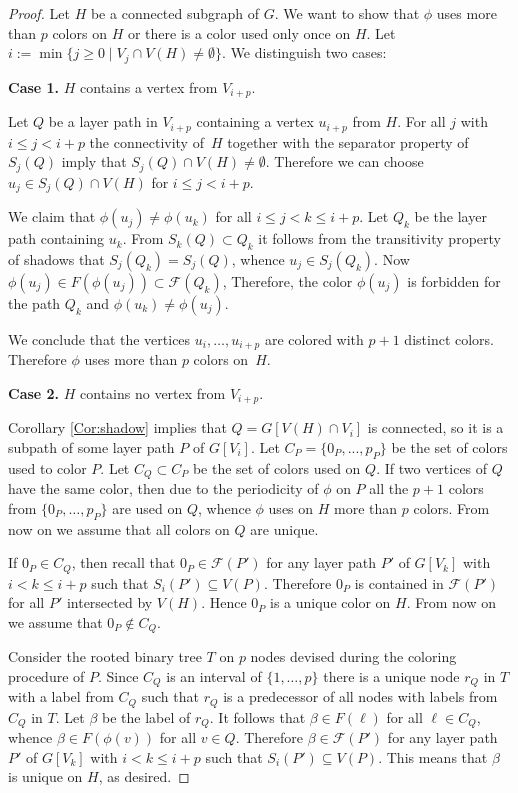 \begin{proof}
  Let $H$ be a connected subgraph of $G$. We want to show that $\phi$
  uses more than $p$ colors on $H$ or there is a color used only once
  on $H$. Let $i:=\min\{j\geq0\mid V_j\cap V(H)\neq \emptyset\}$.  We distinguish two
  cases: \medskip

\noindent\textbf{Case 1.}
$H$ contains a vertex from $V_{i+p}$.

Let $Q$ be a layer path in $V_{i+p}$ containing a vertex $u_{i+p}$
from $H$. For all $j$ with $i\leq j < i+p$ the connectivity of~$H$
together with the separator property of $S_j(Q)$ imply that
$S_j(Q) \cap V(H) \neq \emptyset$. Therefore we can choose
$u_j \in S_j(Q) \cap V(H)$ for $i\leq j < i+p$.

We claim that $\phi(u_j) \neq \phi(u_k)$ for all
$i\leq j < k \leq i+p$.  Let $Q_k$ be the layer path containing
$u_k$. From $S_k(Q) \subset Q_k$ it follows from the transitivity
property of shadows that $S_j(Q_k) = S_j(Q)$, whence $u_j \in S_j(Q_k)$. Now
$\phi(u_j) \in F(\phi(u_j)) \subset \mathcal{F}(Q_k)$,
Therefore, the color $\phi(u_j)$ is forbidden for the path $Q_k$ 
and $\phi(u_k)\neq\phi(u_j)$.
  
We conclude that the vertices $u_i,\ldots,u_{i+p}$ are colored with $p+1$ 
distinct colors. Therefore $\phi$ uses more than $p$ colors on~$H$.
\medskip
  
  \noindent\textbf{Case 2.}
  $H$ contains no vertex from $V_{i+p}$.
		
  Corollary \ref{Cor:shadow} implies that $Q=G[V(H)\cap V_i]$ is connected, so
  it is a subpath of some layer path $P$ of $G[V_i]$. Let $C_P=\{0_P,...,p_P\}$ be the set of colors
  used to color $P$.
  Let $C_Q\subset C_P$ be the set of colors used on $Q$.
  If two vertices of $Q$ have the same color, then due to the periodicity
  of $\phi$ on $P$ all the $p+1$ colors from $\{0_P,\ldots,p_P\}$ are used on $Q$, whence
  $\phi$ uses on $H$
  more than $p$ colors. From now on we assume that all colors on $Q$
  are unique.
  
  If $0_P \in C_Q$, then recall that $0_P \in \mathcal{F}(P')$ for any layer path
  $P'$ of $G[V_k]$ with $i<k\leq i+p$ such that $S_i(P') \subseteq V(P)$.
  Therefore $0_P$ is contained in $\mathcal{F}(P')$ for all $P'$ intersected
  by $V(H)$. Hence $0_P$ is a unique color on $H$. From now on we
  assume that $0_P \not\in C_Q$.
		
  Consider the rooted binary tree $T$ on $p$ nodes devised during the coloring procedure 
  of $P$. Since $C_Q$ is an interval of $\{1,\ldots,p\}$ 
  there is a unique node $r_Q$ in $T$ with a label from $C_Q$ such
  that $r_Q$ is a predecessor of all nodes with labels from $C_Q$ in $T$.
  Let $\beta$ be the label
  of $r_Q$. It follows that $\beta \in F(\ell)$ for all $\ell\in C_Q$, whence
  $\beta\in F(\phi(v))$ for all $v\in Q$.  Therefore $\beta \in \mathcal{F}(P')$
  for any layer path
  $P'$ of $G[V_k]$ with $i<k\leq i+p$ such that $S_i(P') \subseteq V(P)$.
  This means that $\beta$ is unique on $H$, as desired.
\end{proof}

